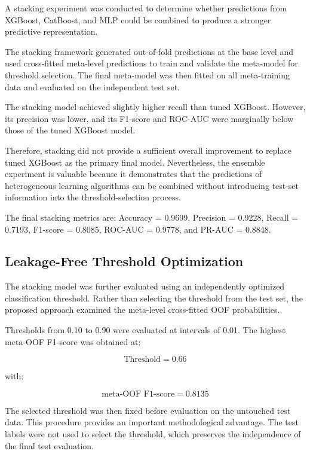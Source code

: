 \documentclass[conference]{IEEEtran}
\begin{document}
A stacking experiment was conducted to determine whether predictions from XGBoost, CatBoost, and MLP could be combined to produce a stronger predictive representation.

The stacking framework generated out-of-fold predictions at the base level and used cross-fitted meta-level predictions to train and validate the meta-model for threshold selection. The final meta-model was then fitted on all meta-training data and evaluated on the independent test set.

The stacking model achieved slightly higher recall than tuned XGBoost. However, its precision was lower, and its F1-score and ROC-AUC were marginally below those of the tuned XGBoost model.

Therefore, stacking did not provide a sufficient overall improvement to replace tuned XGBoost as the primary final model. Nevertheless, the ensemble experiment is valuable because it demonstrates that the predictions of heterogeneous learning algorithms can be combined without introducing test-set information into the threshold-selection process.

The final stacking metrics are: Accuracy = 0.9699, Precision = 0.9228, Recall = 0.7193, F1-score = 0.8085, ROC-AUC = 0.9778, and PR-AUC = 0.8848.

\subsection{Leakage-Free Threshold Optimization}

The stacking model was further evaluated using an independently optimized classification threshold. Rather than selecting the threshold from the test set, the proposed approach examined the meta-level cross-fitted OOF probabilities.

Thresholds from 0.10 to 0.90 were evaluated at intervals of 0.01. The highest meta-OOF F1-score was obtained at:

\begin{equation}
\text{Threshold} = 0.66
\end{equation}

with:

\begin{equation}
\text{meta-OOF F1-score} = 0.8135
\end{equation}

The selected threshold was then fixed before evaluation on the untouched test data. This procedure provides an important methodological advantage. The test labels were not used to select the threshold, which preserves the independence of the final test evaluation.
\end{document}

